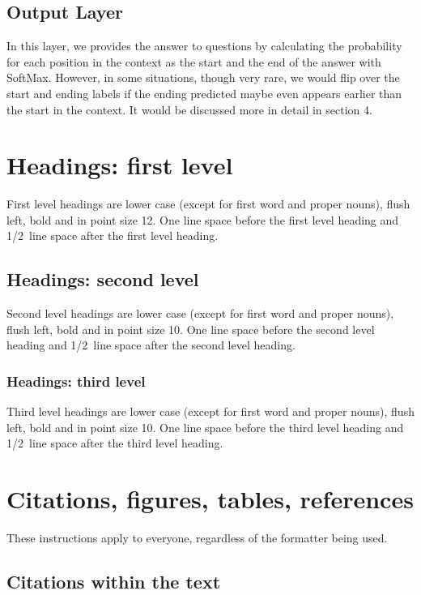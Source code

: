 \documentclass{article} %
\begin{document}
\subsection{Output Layer}

In this layer, we provides the answer to questions by calculating the probability for each position in the context as the start and the end of the answer with SoftMax. However, in some situations, though very rare, we would flip over the start and ending labels if the ending predicted maybe even appears earlier than the start in the context. It would be discussed more in detail in section 4.

\section{Headings: first level}
\label{headings}

First level headings are lower case (except for first word and proper nouns),
flush left, bold and in point size 12. One line space before the first level
heading and 1/2~line space after the first level heading.

\subsection{Headings: second level}

Second level headings are lower case (except for first word and proper nouns),
flush left, bold and in point size 10. One line space before the second level
heading and 1/2~line space after the second level heading.

\subsubsection{Headings: third level}

Third level headings are lower case (except for first word and proper nouns),
flush left, bold and in point size 10. One line space before the third level
heading and 1/2~line space after the third level heading.

\section{Citations, figures, tables, references}
\label{others}

These instructions apply to everyone, regardless of the formatter being used.

\subsection{Citations within the text}
\end{document}
